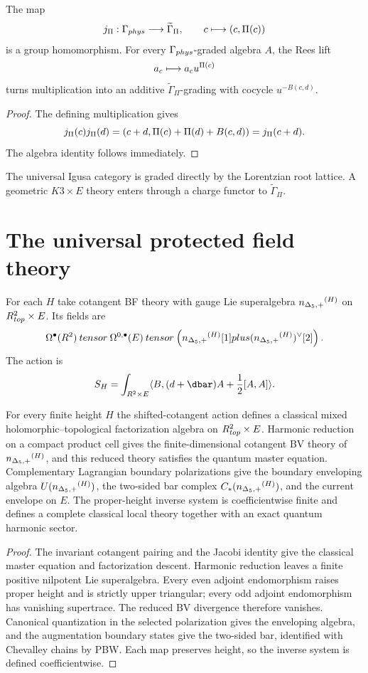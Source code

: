 \begin{theorem}
The map
\[
 j_\Pi:\Gamma_{phys}\longrightarrow\widetilde\Gamma_\Pi,
 \qquad
 c\longmapsto(c,\Pi(c))
\]
is a group homomorphism.  For every $\Gamma_{phys}$-graded algebra $A$, the Rees lift
\[
 a_c\longmapsto a_cu^{\Pi(c)}
\]
turns multiplication into an additive $\widetilde\Gamma_\Pi$-grading with cocycle $u^{-B(c,d)}$.
\end{theorem}
\begin{proof}
The defining multiplication gives
\[
 j_\Pi(c)j_\Pi(d)
 =(c+d,\Pi(c)+\Pi(d)+B(c,d))
 =j_\Pi(c+d).
\]
The algebra identity follows immediately.
\end{proof}

The universal Igusa category is graded directly by the Lorentzian root lattice.  A geometric $K3\times E$ theory enters through a charge functor to $\widetilde\Gamma_\Pi$.

\chapter{The universal protected field theory}
For each $H$ take cotangent BF theory with gauge Lie superalgebra ${n_{\Delta_5,+}}^{(H)}$ on $R^2_{top}\times E$.  Its fields are
\[
 \Omega^\bullet(R^2)\mathbin{tensor}
 \Omega^{0,\bullet}(E)
 \mathbin{tensor}
 \left({n_{\Delta_5,+}}^{(H)}[1]plus({n_{\Delta_5,+}}^{(H)})^\vee[2]\right).
\]
The action is
\[
 S_H=\int_{\R^2\times E}
 \angles{B,(\dd+\dbar)A+\frac12[A,A]}.
\]

\begin{theorem}
For every finite height $H$ the shifted-cotangent action defines a classical mixed holomorphic--topological factorization algebra on $R^2_{top}\times E$.  Harmonic reduction on a compact product cell gives the finite-dimensional cotangent BV theory of ${n_{\Delta_5,+}}^{(H)}$, and this reduced theory satisfies the quantum master equation.  Complementary Lagrangian boundary polarizations give the boundary enveloping algebra $U({n_{\Delta_5,+}}^{(H)})$, the two-sided bar complex $C_*({n_{\Delta_5,+}}^{(H)})$, and the current envelope on $E$.  The proper-height inverse system is coefficientwise finite and defines a complete classical local theory together with an exact quantum harmonic sector.
\end{theorem}
\begin{proof}
The invariant cotangent pairing and the Jacobi identity give the classical master equation and factorization descent.  Harmonic reduction leaves a finite positive nilpotent Lie superalgebra.  Every even adjoint endomorphism raises proper height and is strictly upper triangular; every odd adjoint endomorphism has vanishing supertrace.  The reduced BV divergence therefore vanishes.  Canonical quantization in the selected polarization gives the enveloping algebra, and the augmentation boundary states give the two-sided bar, identified with Chevalley chains by PBW.  Each map preserves height, so the inverse system is defined coefficientwise.
\end{proof}



